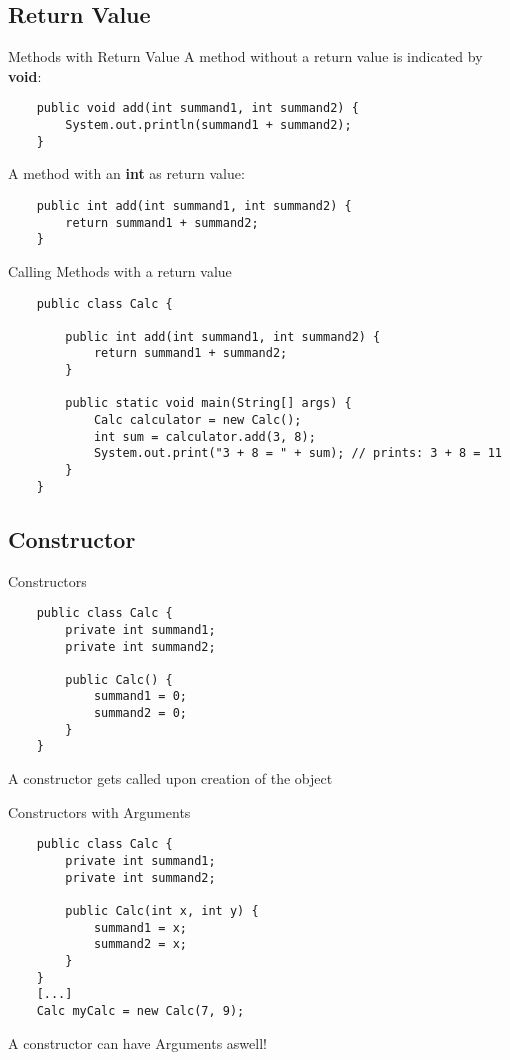 \subsection{Return Value}
\begin{frame}[fragile]{Methods with Return Value}
	A method without a return value is indicated by \textbf{void}:
	\begin{lstlisting}
	public void add(int summand1, int summand2) {
	    System.out.println(summand1 + summand2);
	}
	\end{lstlisting}
	A method with an \textbf{int} as return value:
	\begin{lstlisting}
	public int add(int summand1, int summand2) {
	    return summand1 + summand2;
	}
	\end{lstlisting}
\end{frame}

\begin{frame}[fragile]{Calling Methods with a return value}
	\begin{lstlisting}
	public class Calc {
	
	    public int add(int summand1, int summand2) {
	        return summand1 + summand2;
	    }
	    
	    public static void main(String[] args) {
	        Calc calculator = new Calc();
	        int sum = calculator.add(3, 8);
	        System.out.print("3 + 8 = " + sum); // prints: 3 + 8 = 11
	    }
	}
	\end{lstlisting}
\end{frame}

\subsection{Constructor}

\begin{frame}[fragile]{Constructors}
	\begin{lstlisting}
	public class Calc {
		private int summand1;
		private int summand2;
	
	    public Calc() {
			summand1 = 0;
			summand2 = 0;
	    }
	}
	\end{lstlisting}
	A constructor gets called upon creation of the object
\end{frame}

\begin{frame}[fragile]{Constructors with Arguments}
	\begin{lstlisting}
	public class Calc {
		private int summand1;
		private int summand2;
	
	    public Calc(int x, int y) {
			summand1 = x;
			summand2 = x;
	    }
	}
	[...]
	Calc myCalc = new Calc(7, 9);
	\end{lstlisting}
	A constructor can have Arguments aswell!
\end{frame}


